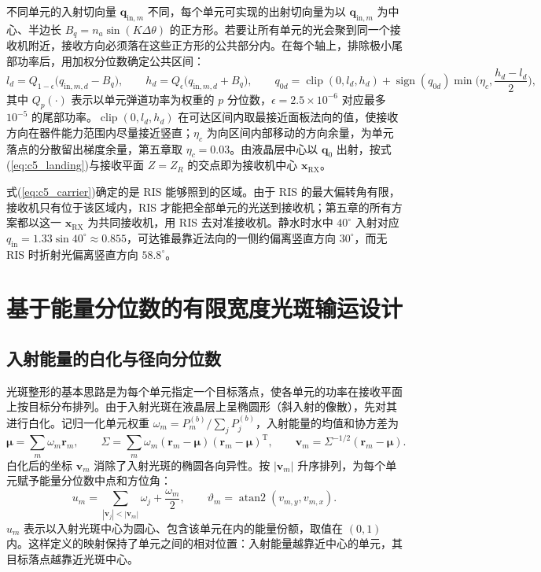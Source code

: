 不同单元的入射切向量 $\mathbf q_{\mathrm{in},m}$ 不同，每个单元可实现的出射切向量为以 $\mathbf q_{\mathrm{in},m}$ 为中心、半边长 $B_q=n_a\sin(K\Delta\theta)$ 的正方形。若要让所有单元的光会聚到同一个接收机附近，接收方向必须落在这些正方形的公共部分内。在每个轴上，排除极小尾部功率后，用加权分位数确定公共区间：
\begin{equation}
l_d=Q_{1-\epsilon}\big(q_{\mathrm{in},m,d}-B_q\big),\qquad
h_d=Q_{\epsilon}\big(q_{\mathrm{in},m,d}+B_q\big),\qquad
q_{0d}=\operatorname{clip}(0,l_d,h_d)+\operatorname{sign}(q_{0d})\min\Big(\eta_c,\frac{h_d-l_d}{2}\Big),
\label{eq:c5_carrier}
\end{equation}
其中 $Q_p(\cdot)$ 表示以单元弹道功率为权重的 $p$ 分位数，$\epsilon=2.5\times10^{-6}$ 对应最多 $10^{-5}$ 的尾部功率。$\operatorname{clip}(0,l_d,h_d)$ 在可达区间内取最接近面板法向的值，使接收方向在器件能力范围内尽量接近竖直；$\eta_c$ 为向区间内部移动的方向余量，为单元落点的分散留出梯度余量，第五章取 $\eta_c=0.03$。由液晶层中心以 $\mathbf q_0$ 出射，按式(\ref{eq:c5_landing})与接收平面 $Z=Z_R$ 的交点即为接收机中心 $\mathbf x_{\mathrm{RX}}$。

式(\ref{eq:c5_carrier})确定的是 RIS 能够照到的区域。由于 RIS 的最大偏转角有限，接收机只有位于该区域内，RIS 才能把全部单元的光送到接收机；第五章的所有方案都以这一 $\mathbf x_{\mathrm{RX}}$ 为共同接收机，用 RIS 去对准接收机。静水时水中 $40^\circ$ 入射对应 $q_{\mathrm{in}}=1.33\sin40^\circ\approx0.855$，可达锥最靠近法向的一侧约偏离竖直方向 $30^\circ$，而无 RIS 时折射光偏离竖直方向 $58.8^\circ$。

\section{基于能量分位数的有限宽度光斑输运设计}
\label{sec:c5_transport}

\subsection{入射能量的白化与径向分位数}

光斑整形的基本思路是为每个单元指定一个目标落点，使各单元的功率在接收平面上按目标分布排列。由于入射光斑在液晶层上呈椭圆形（斜入射的像散），先对其进行白化。记归一化单元权重 $\omega_m=P_m^{(b)}/\sum_jP_j^{(b)}$，入射能量的均值和协方差为
\begin{equation}
\boldsymbol\mu=\sum_m\omega_m\mathbf r_m,\qquad
\Sigma=\sum_m\omega_m(\mathbf r_m-\boldsymbol\mu)(\mathbf r_m-\boldsymbol\mu)^{\mathrm T},\qquad
\mathbf v_m=\Sigma^{-1/2}(\mathbf r_m-\boldsymbol\mu).
\label{eq:c5_whiten}
\end{equation}
白化后的坐标 $\mathbf v_m$ 消除了入射光斑的椭圆各向异性。按 $|\mathbf v_m|$ 升序排列，为每个单元赋予能量分位数中点和方位角：
\begin{equation}
u_m=\sum_{|\mathbf v_j|<|\mathbf v_m|}\omega_j+\frac{\omega_m}{2},\qquad
\vartheta_m=\operatorname{atan2}(v_{m,y},v_{m,x}).
\label{eq:c5_quantile}
\end{equation}
$u_m$ 表示以入射光斑中心为圆心、包含该单元在内的能量份额，取值在 $(0,1)$ 内。这样定义的映射保持了单元之间的相对位置：入射能量越靠近中心的单元，其目标落点越靠近光斑中心。

